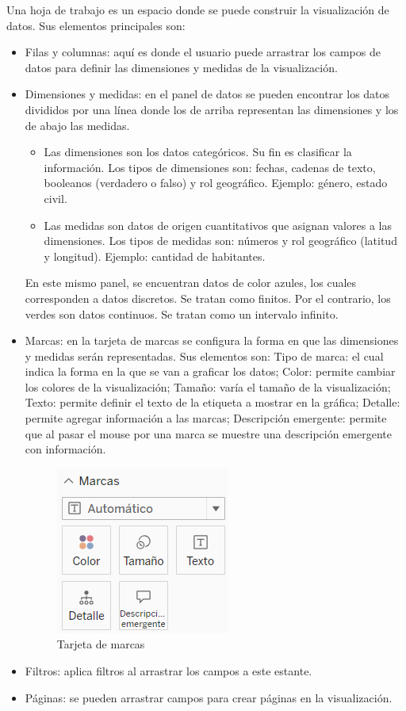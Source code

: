 \documentclass[a4paper, 12pt]{book}
\begin{document}
Una hoja de trabajo es un espacio donde se puede construir la visualización de datos. Sus elementos principales son:
\begin{itemize}
	\item Filas y columnas: aquí es donde el usuario puede arrastrar los campos de datos para definir las dimensiones y medidas de la visualización.
	\item Dimensiones y medidas: en el panel de datos se pueden encontrar los datos divididos por una línea donde los de arriba representan las dimensiones y los de abajo las medidas. 
	\begin{itemize}
		\item Las dimensiones son los datos categóricos. Su fin es clasificar la información. Los tipos de dimensiones son: fechas, cadenas de texto, booleanos (verdadero o falso) y rol geográfico. Ejemplo: género, estado civil.
		\item Las medidas son datos de origen cuantitativos que asignan valores a las dimensiones. Los tipos de medidas son: números y rol geográfico (latitud y longitud). Ejemplo: cantidad de habitantes.
	\end{itemize}
	  En este mismo panel, se encuentran datos de color azules, los cuales corresponden a datos discretos. Se tratan como finitos. Por el contrario, los verdes son datos continuos. Se tratan como un intervalo infinito.
	\item Marcas: en la tarjeta de marcas se configura la forma en que las dimensiones y medidas serán representadas. Sus elementos son: Tipo de marca: el cual indica la forma en la que se van a graficar los datos; Color: permite cambiar los colores de la visualización; Tamaño: varía el tamaño de la visualización; Texto: permite definir el texto de la etiqueta a mostrar en la gráfica; Detalle: permite agregar información a las marcas; Descripción emergente: permite que al pasar el mouse por una marca se muestre una descripción emergente con información.
	\begin{figure}[H] 
		\centering 
		\includegraphics[width=0.3\linewidth]{marcas.png}
		\caption{Tarjeta de marcas}
	\end{figure}
	\item Filtros: aplica filtros al arrastrar los campos a este estante.
	\item Páginas: se pueden arrastrar campos para crear páginas en la visualización.
\end{itemize}
\end{document}
